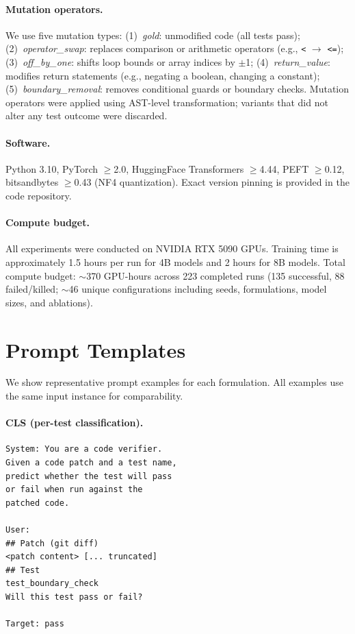 \paragraph{Mutation operators.} We use five mutation types: (1)~\emph{gold}: unmodified code (all tests pass); (2)~\emph{operator\_swap}: replaces comparison or arithmetic operators (e.g., \texttt{<} $\to$ \texttt{<=}); (3)~\emph{off\_by\_one}: shifts loop bounds or array indices by $\pm$1; (4)~\emph{return\_value}: modifies return statements (e.g., negating a boolean, changing a constant); (5)~\emph{boundary\_removal}: removes conditional guards or boundary checks. Mutation operators were applied using AST-level transformation; variants that did not alter any test outcome were discarded.

\paragraph{Software.} Python 3.10, PyTorch ${\geq}$2.0, HuggingFace Transformers ${\geq}$4.44, PEFT ${\geq}$0.12, bitsandbytes ${\geq}$0.43 (NF4 quantization). Exact version pinning is provided in the code repository.

\paragraph{Compute budget.}
All experiments were conducted on NVIDIA RTX 5090 GPUs. Training time is approximately 1.5 hours per run for 4B models and 2 hours for 8B models. Total compute budget: ${\sim}$370 GPU-hours across 223 completed runs (135 successful, 88 failed/killed; ${\sim}$46 unique configurations including seeds, formulations, model sizes, and ablations).

\section{Prompt Templates}
\label{app:prompts}

We show representative prompt examples for each formulation. All examples use the same input instance for comparability.

\paragraph{CLS (per-test classification).}
{\footnotesize\begin{verbatim}
System: You are a code verifier.
Given a code patch and a test name,
predict whether the test will pass
or fail when run against the
patched code.

User:
## Patch (git diff)
<patch content> [... truncated]
## Test
test_boundary_check
Will this test pass or fail?

Target: pass
\end{verbatim}}

